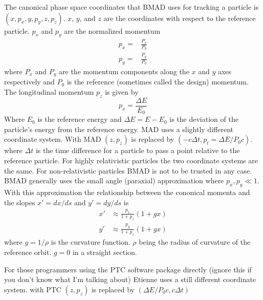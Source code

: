 The canonical phase space coordinates that BMAD uses for tracking a
particle is $(x, p_x, y, p_y, z, p_z)$. $x$, $y$, and $z$ are the
coordinates with respect to the reference particle. $p_x$ and $p_y$
are the normalized momentum
\begin{align}
  p_x = &\frac{P_x}{P_0} \\
  p_y = &\frac{P_y}{P_0}
\end{align}
where $P_x$ and $P_y$ are the momentum components along the $x$ and
$y$ axes respectively and $P_0$ is the reference (sometimes called the
design) momentum. The longitudinal momentum $p_z$ is given by
\begin{equation}
  p_x = \frac{\Delta E}{E_0}
\end{equation}
Where $E_0$ is the reference energy and $\Delta E = E - E_0$ is the
deviation of the particle's energy from the reference energy. MAD uses
a slightly different coordinate system. With MAD $(z, p_z)$ is
replaced by $(-c\Delta t, p_t = \Delta E / P_0 c)$. where $\Delta t$
is the time difference for a particle to pass a point relative to the
reference particle. For highly relativistic particles the two
coordinate systems are the same. For non-relativistic particles BMAD
is not to be trusted in any case. BMAD generally uses the small angle
(paraxial) approximation where $p_x, p_y \ll 1$. With this
approximation the relationship between the cononical momenta and the
slopes $x' = dx/ds$ and $y' = dy/ds$ is
\begin{align}
  x' &\approx \frac{p_x}{1 + p_z} (1 + g x) \\
  y' &\approx \frac{p_y}{1 + p_z} (1 + g x) 
\end{align}
where $g = 1/\rho$ is the curvature function. $\rho$ being the radius
of curvature of the reference orbit. $g = 0$ in a straight section.

For those programmers using the PTC software package directly (ignore
this if you don't know what I'm talking about) Etienne uses a still
different coordinate system. with PTC $(z, p_z)$ is replaced by
$(\Delta E/P_0 c, c \Delta t)$